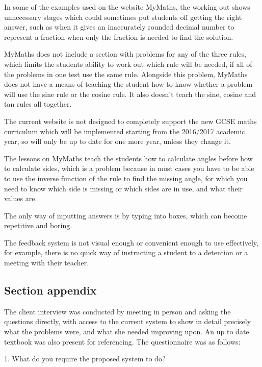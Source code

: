 In some of the examples used on the website MyMaths, the working out shows unnecessary stages which could sometimes put students off getting the right answer, such as when it gives an inaccurately rounded decimal number to represent a fraction when only the fraction is needed to find the solution.

MyMaths does not include a section with problems for any of the three rules, which limits the students ability to work out which rule will be needed, if all of the problems in one test use the same rule. Alongside this problem, MyMaths does not have a means of teaching the student how to know whether a problem will use the sine rule or the cosine rule. It also doesn't teach the sine, cosine and tan rules all together.

The current website is not designed to completely support the new GCSE maths curriculum which will be implemented starting from the 2016/2017 academic year, so will only be up to date for one more year, unless they change it.

The lessons on MyMaths teach the students how to calculate angles before how to calculate sides, which is a problem because in most cases you have to be able to use the inverse function of the rule to find the missing angle, for which you need to know which side is missing or which sides are in use, and what their values are.

The only way of inputting answers is by typing into boxes, which can become repetitive and boring.

The feedback system is not visual enough or convenient enough to use effectively, for example, there is no quick way of instructing a student to a detention or a meeting with their teacher.

\subsection{Section appendix}

The client interview was conducted by meeting in person and asking the questions directly, with access to the current system to show in detail precisely what the problems were, and what she needed improving upon. An up to date textbook was also present for referencing. The questionnaire was as follows:

1. What do you require the proposed system to do?


